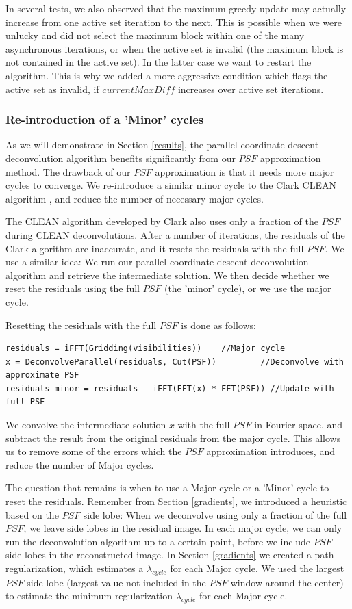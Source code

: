 In several tests, we also observed that the maximum greedy update may actually increase from one active set iteration to the next. This is possible when we were unlucky and did not select the maximum block within one of the many asynchronous iterations, or when the active set is invalid (the maximum block is not contained in the active set). In the latter case we want to restart the algorithm. This is why we added a more aggressive condition which flags the active set as invalid, if $currentMaxDiff$ increases over active set iterations.


\subsubsection{Re-introduction of a 'Minor' cycles}
As we will demonstrate in Section \ref{results}, the parallel coordinate descent deconvolution algorithm benefits significantly from our $PSF$ approximation method. The drawback of our $PSF$ approximation is that it needs more major cycles to converge. We re-introduce a similar minor cycle to the Clark CLEAN algorithm \cite{clark1980efficient}, and reduce the number of necessary major cycles.

The CLEAN algorithm developed by Clark also uses only a fraction of the $PSF$ during CLEAN deconvolutions. After a number of iterations, the residuals of the Clark algorithm are inaccurate, and it resets the residuals with the full $PSF$. We use a similar idea: We run our parallel coordinate descent deconvolution algorithm and retrieve the intermediate solution. We then decide whether we reset the residuals using the full $PSF$ (the 'minor' cycle), or we use the major cycle.

Resetting the residuals with the full $PSF$ is done as follows:
\begin{lstlisting}
residuals = iFFT(Gridding(visibilities))  	//Major cycle
x = DeconvolveParallel(residuals, Cut(PSF)) 		//Deconvolve with approximate PSF
residuals_minor = residuals - iFFT(FFT(x) * FFT(PSF)) //Update with full PSF
\end{lstlisting}

We convolve the intermediate solution $x$ with the full $PSF$ in Fourier space, and subtract the result from the original residuals from the major cycle. This allows us to remove some of the errors which the $PSF$ approximation introduces, and reduce the number of Major cycles.

The question that remains is when to use a Major cycle or a 'Minor' cycle to reset the residuals. Remember from Section \ref{gradients}, we introduced a heuristic based on the $PSF$ side lobe: When we deconvolve using only a fraction of the full $PSF$, we leave side lobes in the residual image. In each major cycle, we can only run the deconvolution algorithm up to a certain point, before we include $PSF$ side lobes in the reconstructed image. In Section \ref{gradients} we created a path regularization, which estimates a $\lambda_{cycle}$ for each Major cycle. We used the largest $PSF$ side lobe (largest value not included in the $PSF$ window around the center) to estimate the minimum regularization $\lambda_{cycle}$ for each Major cycle.

